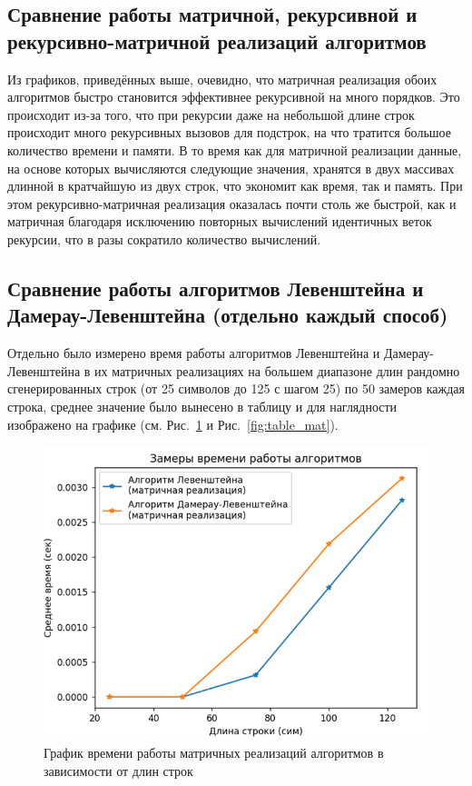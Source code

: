 \subsection{Сравнение работы матричной, рекурсивной и рекурсивно-матричной реализаций алгоритмов}

\hspace{1.25cm}
Из графиков, приведённых выше, очевидно, что матричная реализация обоих алгоритмов быстро становится эффективнее рекурсивной на много порядков. Это происходит из-за того, что при рекурсии даже на небольшой длине строк происходит много рекурсивных вызовов для подстрок, на что тратится большое количество времени и памяти. В то время как для матричной реализации данные, на основе которых вычисляются следующие значения, хранятся в двух массивах длинной в кратчайшую из двух строк, что экономит как время, так и память. При этом рекурсивно-матричная реализация оказалась почти столь же быстрой, как и матричная благодаря исключению повторных вычислений идентичных веток рекурсии, что в разы сократило количество вычислений.

\subsection{Сравнение работы алгоритмов Левенштейна и Дамерау-Левенштейна (отдельно каждый способ)}

\hspace{1.25cm}
Отдельно было измерено время работы алгоритмов Левенштейна и Дамерау-Левенштейна в их матричных реализациях на большем диапазоне длин рандомно сгенерированных строк (от 25 символов до 125 с шагом 25) по 50 замеров каждая строка, среднее значение было вынесено в таблицу и для наглядности изображено на графике (см. Рис.~\ref{fig:graph_mat} и Рис.~\ref{fig:table_mat}).

\begin{figure}[H]
    \centering
    \includegraphics[width=1\textwidth]{img/graph_mat.png}
    \caption{График времени работы матричных реализаций алгоритмов в зависимости от длин строк}
    \label{fig:graph_mat}
\end{figure}

